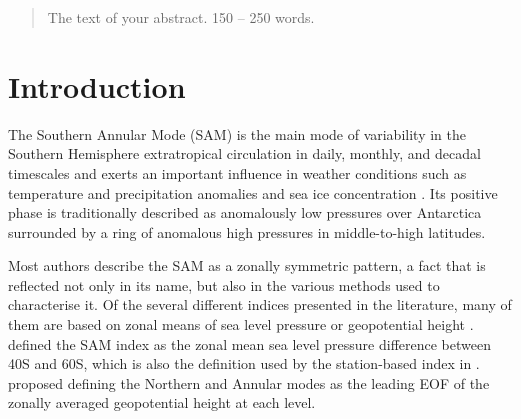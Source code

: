 \documentclass[smallextended]{svjour3}       %
\begin{document}
\date{Received: date / Accepted: date}


\maketitle

\begin{abstract}
The text of your abstract. 150 -- 250 words.
\\


\end{abstract}


\def\spacingset#1{\renewcommand{\baselinestretch}%
{#1}\small\normalsize} \spacingset{1}


\hypertarget{introduction}{%
\section{Introduction}\label{introduction}}

The Southern Annular Mode (SAM) is the main mode of variability in the Southern Hemisphere extratropical circulation \citep{rogers1982} in daily, monthly, and decadal timescales \citep{baldwin2001a, fogt2006} and exerts an important influence in weather conditions such as temperature and precipitation anomalies and sea ice concentration \citep[e.g.][]{fogt2020}. Its positive phase is traditionally described as anomalously low pressures over Antarctica surrounded by a ring of anomalous high pressures in middle-to-high latitudes.

Most authors describe the SAM as a zonally symmetric pattern, a fact that is reflected not only in its name, but also in the various methods used to characterise it. Of the several different indices presented in the literature, many of them are based on zonal means of sea level pressure or geopotential height \citep{ho2012}. \citet{gong1999} defined the SAM index as the zonal mean sea level pressure difference between 40\degree S and 60\degree S, which is also the definition used by the station-based index in \citet{marshall2003}. \citet{baldwin2009} proposed defining the Northern and Annular modes as the leading EOF of the zonally averaged geopotential height at each level.
\end{document}
